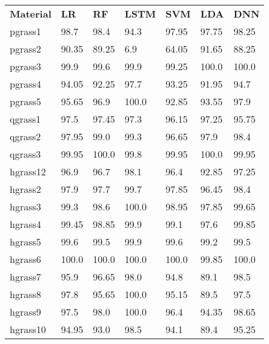 \begin{table}
	\begin{center}
		\begin{tabular}{|l|l|l|l|l|l|l|}
		\hline
		\rowcolor{gray!150}
		\rule{0pt}{25pt}\color{white}\textbf{Material} & \color{white}\textbf{LR} & \color{white}\textbf{RF} & \color{white}\textbf{LSTM} & \color{white}\textbf{SVM} & \color{white}\textbf{LDA} & \color{white}\textbf{DNN}\\
		pgrass1 & 98.7 & 98.4 & \cellcolor{red!20}94.3 & 97.95 & 97.75 & 98.25\\
		pgrass2 & \cellcolor{red!20}90.35 & \cellcolor{red!20}89.25 & \cellcolor{red!20}6.9 & \cellcolor{red!20}64.05 & \cellcolor{red!20}91.65 & \cellcolor{red!20}88.25\\
		pgrass3 & 99.9 & 99.6 & 99.9 & 99.25 & 100.0 & 100.0\\
		pgrass4 & \cellcolor{red!20}94.05 & \cellcolor{red!20}92.25 & 97.7 & \cellcolor{red!20}93.25 & \cellcolor{red!20}91.95 & \cellcolor{red!20}94.7\\
		pgrass5 & 95.65 & 96.9 & 100.0 & \cellcolor{red!20}92.85 & \cellcolor{red!20}93.55 & 97.9\\
		qgrass1 & 97.5 & 97.45 & 97.3 & 96.15 & 97.25 & 95.75\\
		qgrass2 & 97.95 & 99.0 & 99.3 & 96.65 & 97.9 & 98.4\\
		qgrass3 & 99.95 & 100.0 & 99.8 & 99.95 & 100.0 & 99.95\\
		hgrass12 & 96.9 & 96.7 & 98.1 & 96.4 & \cellcolor{red!20}92.85 & 97.25\\
		hgrass2 & 97.9 & 97.7 & 99.7 & 97.85 & 96.45 & 98.4\\
		hgrass3 & 99.3 & 98.6 & 100.0 & 98.95 & 97.85 & 99.65\\
		hgrass4 & 99.45 & 98.85 & 99.9 & 99.1 & 97.6 & 99.85\\
		hgrass5 & 99.6 & 99.5 & 99.9 & 99.6 & 99.2 & 99.5\\
		hgrass6 & 100.0 & 100.0 & 100.0 & 100.0 & 99.85 & 100.0\\
		hgrass7 & 95.9 & 96.65 & 98.0 & \cellcolor{red!20}94.8 & \cellcolor{red!20}89.1 & 98.5\\
		hgrass8 & 97.8 & 95.65 & 100.0 & 95.15 & \cellcolor{red!20}89.5 & 97.5\\
		hgrass9 & 97.5 & 98.0 & 100.0 & 96.4 & \cellcolor{red!20}94.35 & 98.65\\
		hgrass10 & \cellcolor{red!20}94.95 & \cellcolor{red!20}93.0 & 98.5 & \cellcolor{red!20}94.1 & \cellcolor{red!20}89.4 & 95.25\\

\end{tabular}
\end{center}
\end{table}
